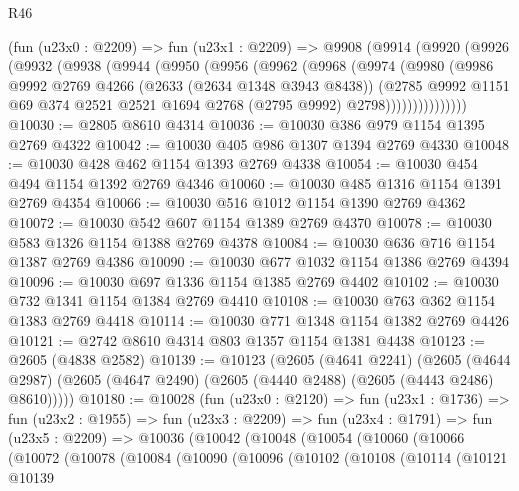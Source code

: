 \begin{lexlean}{R46}
\begin{coremodule}
    (fun (u23x0 : @2209) =>
    fun (u23x1 : @2209) =>
    @9908
      (@9914
        (@9920
          (@9926
            (@9932
              (@9938
                (@9944
                  (@9950
                    (@9956
                      (@9962
                        (@9968
                          (@9974
                            (@9980
                              (@9986
                                @9992
                                @2769
                                @4266
                                (@2633 (@2634 @1348 @3943 @8438))
                                (@2785
                                  @9992
                                  @1151
                                  @69
                                  @374
                                  @2521
                                  @2521
                                  @1694
                                  @2768
                                  (@2795 @9992)
                                  @2798)))))))))))))))
@10030 := @2805 @8610 @4314
@10036 := @10030 @386 @979 @1154 @1395 @2769 @4322
@10042 := @10030 @405 @986 @1307 @1394 @2769 @4330
@10048 := @10030 @428 @462 @1154 @1393 @2769 @4338
@10054 := @10030 @454 @494 @1154 @1392 @2769 @4346
@10060 := @10030 @485 @1316 @1154 @1391 @2769 @4354
@10066 := @10030 @516 @1012 @1154 @1390 @2769 @4362
@10072 := @10030 @542 @607 @1154 @1389 @2769 @4370
@10078 := @10030 @583 @1326 @1154 @1388 @2769 @4378
@10084 := @10030 @636 @716 @1154 @1387 @2769 @4386
@10090 := @10030 @677 @1032 @1154 @1386 @2769 @4394
@10096 := @10030 @697 @1336 @1154 @1385 @2769 @4402
@10102 := @10030 @732 @1341 @1154 @1384 @2769 @4410
@10108 := @10030 @763 @362 @1154 @1383 @2769 @4418
@10114 := @10030 @771 @1348 @1154 @1382 @2769 @4426
@10121 := @2742 @8610 @4314 @803 @1357 @1154 @1381 @4438
@10123 := @2605 (@4838 @2582)
@10139 := @10123
    (@2605
      (@4641 @2241)
      (@2605 (@4644 @2987) (@2605 (@4647 @2490) (@2605 (@4440 @2488) (@2605 (@4443 @2486) @8610)))))
@10180 := @10028
    (fun (u23x0 : @2120) =>
    fun (u23x1 : @1736) =>
    fun (u23x2 : @1955) =>
    fun (u23x3 : @2209) =>
    fun (u23x4 : @1791) =>
    fun (u23x5 : @2209) =>
    @10036
      (@10042
        (@10048
          (@10054
            (@10060
              (@10066
                (@10072
                  (@10078
                    (@10084
                      (@10090
                        (@10096
                          (@10102
                            (@10108
                              (@10114
                                (@10121
                                  @10139

\end{coremodule}
\end{lexlean}
